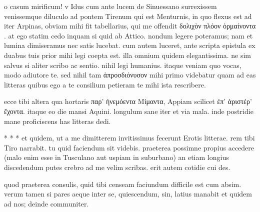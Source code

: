 


 o casum mirificum! v Idus cum ante lucem de Sinuessano surrexissem venissemque diluculo ad pontem Tirenum qui est Menturnis, in quo flexus est ad iter Arpinas, obviam mihi fit tabellarius, qui me offendit δολιχὸν πλόον ὁρμαίνοντα . at ego statim cedo inquam si quid ab Attico. nondum legere poteramus; nam et lumina dimiseramus nec satis lucebat. cum autem luceret, ante scripta epistula ex duabus tuis prior mihi legi coepta est. illa omnium quidem elegantissima. ne sim salvus si aliter scribo ac sentio. nihil legi humanius. itaque veniam quo vocas, modo adiutore te. sed nihil tam ἀπροσδιόνυσον mihi primo videbatur quam ad eas litteras quibus ego a te consilium petieram te mihi ista rescribere.

 ecce tibi altera qua hortaris παρ' ἠνεμόεντα Μίμαντα, Appiam scilicet ἐπ' ἀριστέρ' ἔχοντα. itaque eo die mansi Aquini. longulum sane iter et via mala. inde postridie mane proficiscens has litteras dedi.

 * * * et quidem, ut a me dimitterem invitissimus fecerunt Erotis litterae. rem tibi Tiro narrabit. tu quid faciendum sit videbis. praeterea possimne propius accedere (malo enim esse in Tusculano aut uspiam in suburbano) an etiam longius discedendum putes crebro ad me velim scribas. erit autem cotidie cui des.

 quod praeterea consulis, quid tibi censeam faciundum difficile est cum absim. verum tamen si pares aeque inter se, quiescendum, sin, latius manabit et quidem ad nos; deinde communiter.

